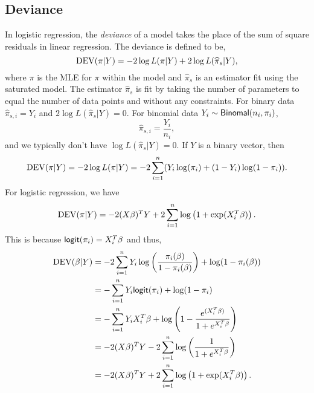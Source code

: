 \subsection{Deviance}
In  logistic regression, the \emph{deviance} of a model takes the place of the sum of square residuals in linear regression.  The  deviance is defined to be,
\[\operatorname{DEV}(\pi|Y) =  -2\log L(\pi|Y)+2\log L(\widehat{\pi}_s|Y), \]
where $\pi$ is the MLE for $\pi$ within the model  and $\widehat{\pi}_s$ is an  estimator fit using the saturated model. The estimator  $\widehat{\pi}_s$  is fit by taking the number of parameters to equal the number of data points and without  any constraints. For binary data $\widehat{\pi}_{s,i} = Y_i$ and $2\log L(\widehat{\pi}_s|Y) = 0$. For binomial data $Y_i \sim \mathsf{Binomal}(n_i,\pi_i)$,
\[\widehat{\pi}_{s,i}=\frac{Y_i}{n_i},\]  
and we typically don't have $\log L(\widehat{\pi}_s|Y)=0$. If $Y$ is a binary vector, then
\[\operatorname{DEV}(\pi|Y)= -2\log L(\pi|Y)= -2\sum_{i=1}^n(Y_i\log(\pi_i)+(1-Y_i)\log(1-\pi_i)).\]
For logistic regression, we have
\[\operatorname{DEV}(\pi|Y) = -2(X\beta)^TY+2\sum_{i=1}^n \log\left(1+\exp(X_i^T\beta)\right).\]
This is because $\mathsf{logit}(\pi_i)=X_i^T\beta$ and thus,
\begin{align*}
\operatorname{DEV}(\beta|Y) &=-2\sum_{i=1}^n Y_i\log\left(\frac{\pi_i(\beta)}{1-\pi_i(\beta)}\right)+\log(1-\pi_i(\beta))\\
&=-\sum_{i=1}^n Y_i \mathsf{logit}(\pi_i)+\log(1-\pi_i)\\
&=-\sum_{i=1}^n Y_i X_i^T\beta + \log\left(1-\frac{e^{(X_i^T\beta)}}{1+e^{X_i^T\beta}}\right)\\
&=-2(X\beta)^TY-2\sum_{i=1}^n \log\left(\frac{1}{1+e^{X_i^T\beta}}\right)\\
&=-2(X\beta)^TY+2\sum_{i=1}^n\log\left(1+\exp(X_i^T\beta)\right).
\end{align*}
